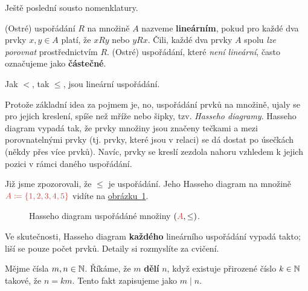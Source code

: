 Ještě poslední sousto nomenklatury.

\begin{definition}
 (Ostré) uspořádání $R$ na množině $A$ nazveme \textbf{lineárním}, pokud pro každé dva
 prvky $x,y \in A$ platí, že $xRy$ nebo $yRx$. Čili, každé dva prvky $A$ spolu
 \emph{lze porovnat} prostřednictvím $R$. (Ostré) uspořádání, které \emph{není
 lineární}, často označujeme jako \textbf{částečné}.
\end{definition}

\begin{example}
 Jak $<$, tak $ \leq $, jsou lineární uspořádání.
\end{example}

Protože základní idea za pojmem  je, no, uspořádání prvků na
množině, ujaly se pro jejich kreslení, spíše než mříže nebo šipky, tzv.
\emph{Hasseho diagramy}. Hasseho diagram vypadá tak, že prvky množiny jsou
značeny tečkami a mezi porovnatelnými prvky (tj. prvky, které jsou v relaci) se
dá dostat po úsečkách (někdy přes více prvků). Navíc, prvky se kreslí zezdola
nahoru vzhledem k jejich pozici v rámci daného uspořádání.

\begin{example}
 Již jsme zpozorovali, že $ \leq $ je uspořádání. Jeho Hasseho diagram na
 množině $\clr{A \coloneqq \{1,2,3,4,5\}}$ vidíte na
 \hyperref[fig:hasse-linear]{obrázku~\ref*{fig:hasse-linear}}.
 \begin{figure}[H]
  \centering
  \caption{Hasseho diagram uspořádáné množiny $(\clr{A}, \leq)$.}
  \label{fig:hasse-linear}
 \end{figure}
 Ve skutečnosti, Hasseho diagram \textbf{každého} lineárního uspořádání vypadá
 takto; liší se pouze počet prvků. Detaily si rozmyslíte za cvičení.
\end{example}

\begin{definition}[Dělitelnost]
 \label{def:delitelnost}
 Mějme čísla $m,n \in \mathbb{N}$. Říkáme, že $m$ \textbf{dělí} $n$, když existuje
 přirozené číslo $k \in \mathbb{N}$ takové, že $n = km$. Tento fakt zapisujeme jako $m
 \mid n$.
\end{definition}

